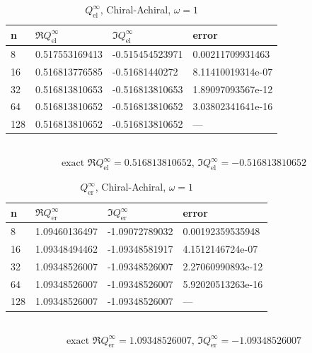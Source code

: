 \begin{table}
  \centering
  \renewcommand{\arraystretch}{1.1}
  \caption{$Q_\text{el}^\infty$, Chiral-Achiral, $\omega=1$}
  \begin{tabular}{@{}llll@{}}
    \toprule
    n & $\Re{Q_\text{el}^\infty}$ & $\Im{Q_\text{el}^\infty}$ & error \\
    \midrule
8 & 0.517553169413 & -0.515454523971 & 0.00211709931463\\ 
16 & 0.516813776585 & -0.51681440272 & 8.11410019314e-07\\ 
32 & 0.516813810653 & -0.516813810653 & 1.89097093567e-12\\ 
64 & 0.516813810652 & -0.516813810652 & 3.03802341641e-16\\ 
128 & 0.516813810652 & -0.516813810652 & ---\\ 
    \bottomrule
  \end{tabular}
  \\ 
  $$\text{exact }\Re{Q_\text{el}^\infty}=0.516813810652,\,\Im{Q_\text{el}^\infty}=-0.516813810652$$  
\end{table}

\begin{table}
  \centering
  \renewcommand{\arraystretch}{1.1}
  \caption{$Q_\text{er}^\infty$, Chiral-Achiral, $\omega=1$}
  \begin{tabular}{@{}llll@{}}
    \toprule
    n & $\Re{Q_\text{er}^\infty}$ & $\Im{Q_\text{er}^\infty}$ & error \\
    \midrule
8 & 1.09460136497 & -1.09072789032 & 0.00192359535948\\ 
16 & 1.09348494462 & -1.09348581917 & 4.1512146724e-07\\ 
32 & 1.09348526007 & -1.09348526007 & 2.27060990893e-12\\ 
64 & 1.09348526007 & -1.09348526007 & 5.92020513263e-16\\ 
128 & 1.09348526007 & -1.09348526007 & ---\\ 
    \bottomrule
  \end{tabular}
  \\ 
  $$\text{exact }\Re{Q_\text{er}^\infty}=1.09348526007,\,\Im{Q_\text{er}^\infty}=-1.09348526007$$  
\end{table}

